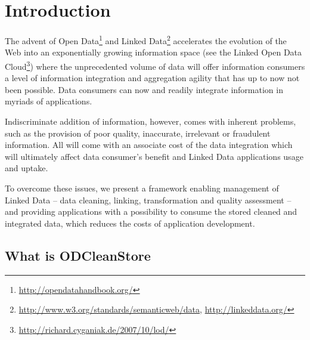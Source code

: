 
\newcommand{\version}{0.1}
\newcommand{\documentname}{User Manual}





\renewcommand{\contentsname}{Contents}
\tableofcontents
\bigskip

\newpage


\chapter{Introduction}

The advent of Open Data\footnote{\url{http://opendatahandbook.org/}} and Linked Data\footnote{\url{http://www.w3.org/standards/semanticweb/data}, \url{http://linkeddata.org/}}  accelerates the evolution of the Web into an exponentially growing information space (see the Linked Open Data Cloud\footnote{\url{http://richard.cyganiak.de/2007/10/lod/}}) where the unprecedented volume of data will offer information consumers a level of information integration and aggregation agility that has up to now not been possible. Data consumers can now  and readily integrate information in myriads of applications.

Indiscriminate addition of information, however, comes with inherent problems, such as the provision of poor quality, inaccurate, irrelevant or fraudulent information. All will come with an associate cost of the data integration which will ultimately affect data consumer's benefit and Linked Data applications usage and uptake.

To overcome these issues, we present a framework enabling management of Linked Data -- data cleaning, linking, transformation and quality assessment -- and providing  applications with a possibility to consume the stored cleaned and integrated data, which reduces the costs of application development.



\section{What is ODCleanStore}

